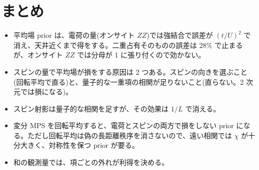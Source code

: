\section{まとめ}
\begin{itemize}
  \item 平均場 prior は、電荷の量(オンサイト $ZZ$)では強結合で誤差が $(t/U)^2$ で消え、天井近くまで得をする。二重占有そのものの誤差は 28\% で止まるが、オンサイト $ZZ$ では分母が 1 に張り付くので効かない。
  \item スピンの量で平均場が損をする原因は 2 つある。スピンの向きを選ぶこと(回転平均で直る)と、量子的な一重項の相関が足りないこと(直らない。2 次元では損になる)。
  \item スピン射影は量子的な相関を足すが、その効果は $1/L$ で消える。
  \item 変分 MPS を回転平均すると、電荷とスピンの両方で損をしない prior になる。ただし回転平均は偽の長距離秩序を消さないので、遠い相関では $\chi$ が十分大きく、対称性を保つ prior が要る。
  \item 和の観測量では、項ごとの外れが利得を決める。
\end{itemize}
